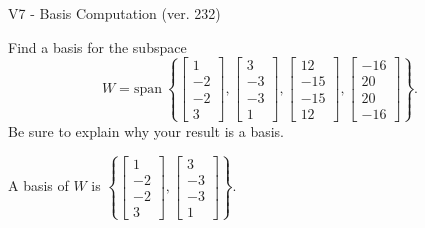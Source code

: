 \begin{exercise}
  \begin{exerciseTitle}V7 - Basis Computation (ver. 232)\end{exerciseTitle}
  \begin{exerciseStatement}
    Find a basis for the subspace 
\[W=\mathrm{span}\ \left\{\left[\begin{array}{r}
1 \\
-2 \\
-2 \\
3
\end{array}\right] , \left[\begin{array}{r}
3 \\
-3 \\
-3 \\
1
\end{array}\right] , \left[\begin{array}{r}
12 \\
-15 \\
-15 \\
12
\end{array}\right] , \left[\begin{array}{r}
-16 \\
20 \\
20 \\
-16
\end{array}\right]\right\}.\]
 Be sure to explain why your result is a basis.


  \end{exerciseStatement}
  \begin{exerciseAnswer}
   A basis of \(W\) is  \(\left\{\left[\begin{array}{r}
1 \\
-2 \\
-2 \\
3
\end{array}\right] , \left[\begin{array}{r}
3 \\
-3 \\
-3 \\
1
\end{array}\right]\right\}\).
  


  \end{exerciseAnswer}
\end{exercise}